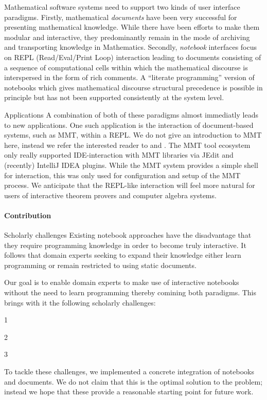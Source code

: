 Mathematical software systems need to support two kinds of user interface paradigms.
Firstly, mathematical \emph{documents} have been very successful for presenting mathematical knowledge.
While there have been efforts to make them modular and interactive, they predominantly remain in the mode of archiving and transporting knowledge in Mathematics.
Secondly, \emph{notebook} interfaces focus on REPL (Read/Eval/Print Loop) interaction leading to documents consisting of a sequence of computational cells within which the mathematical discourse is interspersed in the form of rich comments.
A ``literate programming'' version of notebooks which gives mathematical discourse structural precedence is possible in principle but has not been supported consistently at the system level.

\begin{newpart}{Applications}
A combination of both of these paradigms almost immediatly leads to new applications. 
One such application is the interaction of document-based systems, such as MMT, within a REPL.
We do not give an introduction to MMT here, instead we refer the interested reader to \cite{RabKoh:WSMSML13} and \cite{uniformal:URL}. 
The MMT tool ecosystem only really supported IDE-interaction with MMT libraries via JEdit and (recently) IntelliJ IDEA plugins. 
While the MMT system provides a simple shell for interaction, this was only used for configuration and setup of the MMT process.
We anticipate that the REPL-like interaction will feel more natural for users of interactive theorem provers and computer algebra systems.
\end{newpart}

\paragraph{Contribution}

\begin{newpart}{Scholarly challenges}
Existing notebook approaches have the disadvantage that they require programming knowledge in order to become truly interactive.
It follows that domain experts seeking to expand their knowledge either learn programming or remain restricted to using static documents. 

Our goal is to enable domain experts to make use of interactive notebooks without the need to learn programming thereby comining both paradigms. 
This brings with it the following scholarly challenges:
\begin{compactenum}[\em i\rm )]
\item 1
\item 2
\item 3
\end{compactenum}

To tackle these challenges, we implemented a concrete integration of notebooks and documents. 
We do not claim that this is the optimal solution to the problem; instead we hope that these provide a reasonable starting point for future work. 
\end{newpart}

